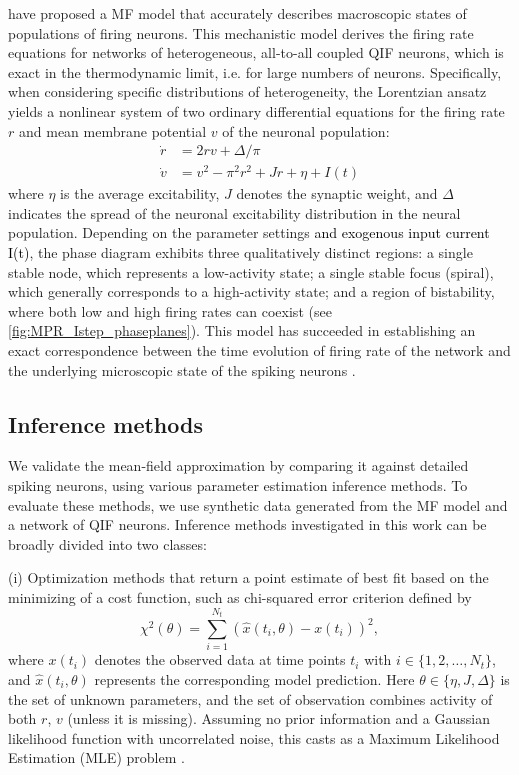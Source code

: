 \documentclass[12pt]{article}
\begin{document}
\cite{Montbrio_Pazo_Roxin} have proposed a MF model that accurately describes macroscopic states of populations of firing neurons. This mechanistic model derives the firing rate equations for networks of heterogeneous, all-to-all coupled QIF neurons, which is exact in the thermodynamic limit, i.e. for large numbers of neurons. Specifically, when considering specific distributions of heterogeneity, the Lorentzian ansatz yields a nonlinear system of two ordinary differential equations for the firing rate $r$ and mean membrane potential $v$ of the neuronal population:
\begin{subequations}
\begin{align}
    \dot{r} &= 2 r v +\Delta/\pi  \label{eq:mpr_r} \\
    \dot{v} &= v^2 - \pi^2 r^2 + J r + \eta+ I(t) \label{eq:mpr_v}
\end{align}
\label{eq:mpr}
\end{subequations}
where $\eta$ is the average excitability, $J$ denotes the synaptic weight, and $\Delta$ indicates the spread of the neuronal excitability distribution in the neural population. Depending on the parameter settings \textcolor{black}{and exogenous input current I(t)}, the phase diagram exhibits three qualitatively distinct regions: a single stable node, which represents a low-activity state; a single stable focus (spiral), which generally corresponds to a high-activity state; and a region of bistability, where both low and high firing rates can coexist (see \autoref{fig:MPR_Istep_phaseplanes}). This model has succeeded in establishing an exact correspondence between the time evolution of firing rate of the network and the underlying microscopic state of the spiking neurons \citep{Montbrio_Pazo_Roxin}.


\subsection{Inference methods}

We validate the mean-field approximation by comparing it against detailed spiking neurons, using various parameter estimation inference methods. To evaluate these methods, we use synthetic data generated from the MF model and a network of QIF neurons.
Inference methods investigated in this work can be broadly divided into two classes:

(i) Optimization methods that return a point estimate of best fit based on the minimizing of a cost function, such as chi-squared error criterion defined by 
\begin{equation}
\label{eq:khi}
{\chi^2}({\theta})= \sum\limits_{i=1}^{N_t} \left({\hat x}(t_i, \theta)-{x}(t_i)\right)^2,
\end{equation}
where $x(t_{i})$ denotes the observed data at time points $t_i$ with $ i \in \{1, 2, \dots, N_t\}$, and ${\hat x}(t_i,{ \theta})$ represents the corresponding model prediction. Here $\theta \in \{ \eta, J, \Delta \}$ is the set of unknown parameters, and the set of observation combines activity of both $r$, $v$ (unless it is missing). Assuming no prior information and a Gaussian likelihood function with uncorrelated noise, this casts as a Maximum Likelihood Estimation (MLE) problem \citep{Hashemi2018}.
\end{document}
